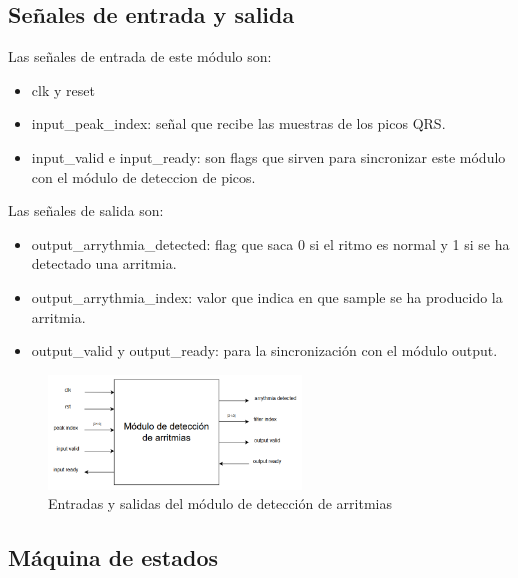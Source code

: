 \subsection{Señales de entrada y salida}
Las señales de entrada de este módulo son:

\begin{itemize}
    \item clk y reset
    \item input\_peak\_index: señal que recibe las muestras de los picos QRS.
    \item input\_valid e input\_ready: son flags que sirven para sincronizar este módulo con el módulo de deteccion de picos. 
\end{itemize}
    
Las señales de salida son:

\begin{itemize}
    \item output\_arrythmia\_detected: flag que saca 0 si el ritmo es normal y 1 si se ha detectado una arritmia.
    \item output\_arrythmia\_index: valor que indica en que sample se ha producido la arritmia.
    \item output\_valid y output\_ready: para la sincronización con el módulo output.
\end{itemize}

\begin{figure}[h!]
    \centering
    \includegraphics[width=0.6\textwidth]{./Images/img_implementacion_hw/diagramamodulodeteccionarritmias.png}
    \caption{Entradas y salidas del módulo de detección de arritmias}
    \label{fig:moddeteccionarritmias}
\end{figure} 

\subsection{Máquina de estados}

